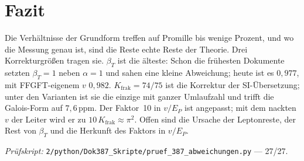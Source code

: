 \section{Fazit}

Die Verhältnisse der Grundform treffen auf Promille bis wenige Prozent, und wo die Messung genau
ist, sind die Reste echte Reste der Theorie. Drei Korrekturgrößen tragen sie. $\beta_T$ ist die
älteste: Schon die frühesten Dokumente setzten $\beta_T=1$ neben $\alpha=1$ und sahen eine kleine
Abweichung; heute ist es $0{,}977$, mit FFGFT-eigenem $v$ $0{,}982$. $K_{\text{frak}}=74/75$ ist
die Korrektur der SI-Übersetzung; unter den Varianten ist sie die einzige mit ganzer Umlaufzahl
und trifft die Galois-Form auf $7{,}6$\,ppm. Der Faktor~10 in $v/E_P$ ist angepasst; mit dem
nackten $v$ der Leiter wird er zu $10\,K_{\text{frak}}\approx\pi^2$. Offen sind die Ursache der
Leptonreste, der Rest von $\beta_T$ und die Herkunft des Faktors in $v/E_P$.

\vspace{1em}
\noindent\textit{Prüfskript:} \texttt{2/python/Dok387\_Skripte/pruef\_387\_abweichungen.py}
--- 27/27.
